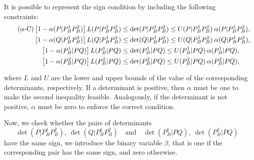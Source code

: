 \documentclass[a4paper,  review, authoryear, 1p., doubleblind]{elsarticle}
\newcommand{\determinant}[3]{\det({#1|#2#3})}
\begin{document}
	It is possible to represent the sign condition by including the following constraints:
	\begin{align*}\tag{$\alpha$-C}\label{eq:alphaC}
		\left[1-\alphamas{P}{P_B^1}{P_B^2}\right]\LS{P}{P_B^1}{P_B^2}&\leq\determinant{P}{P_B^1}{P_B^2}\leq \US{P}{P_B^1}{P_B^2}\:\alphamas{P}{P_B^1}{P_B^2},\\
		\left[1-\alphamas{Q}{P_B^1}{P_B^2}\right]\LS{Q}{P_B^1}{P_B^2}&\leq\determinant{Q}{P_B^1}{P_B^2}\leq \US{Q}{P_B^1}{P_B^2}\:\alphamas{Q}{P_B^1}{P_B^2},\\
		\left[1-\alphamas{P_B^1}{P}{Q}\right]\LS{P_B^1}{P}{Q}&\leq\determinant{P_B^1}{P}{Q}\leq \US{P_B^1}{P}{Q}\:\alphamas{P_B^1}{P}{Q},\\		\left[1-\alphamas{P_B^2}{P}{Q}\right]\LS{P_B^2}{P}{Q}&\leq\determinant{P_B^2}{P}{Q}\leq \US{P_B^2}{P}{Q}\:\alphamas{P_B^2}{P}{Q},
	\end{align*}
	
	\noindent where $L$ and $U$ are the lower and upper bounds of the value of the corresponding determinants, respectively. If a determinant is positive, then $\alpha$ must be one to make the second inequality feasible. Analogously, if the determinant is not positive, $\alpha$ must be zero to enforce the correct condition.
	
	\newcommand{\betamas}[4]{\beta(#1#2|#3#4)}
	
	Now, we check whether the pairs of determinants 
	\begin{equation}\label{eq:pair}
		\determinant{P}{P_B^1}{P_B^2},\: \determinant{Q}{P_B^1}{P_B^2}\quad \text{and} \quad \determinant{P_B^1}{P}{Q},\:	 \determinant{P_B^2}{P}{Q}
	\end{equation} 
	have the same sign, we introduce the binary variable $\beta$, that is one if the corresponding pair has the same sign, and zero otherwise.
	
	\newcommand{\gammaprod}[4]{\gamma(#1#2|#3#4)}
	
\end{document}
